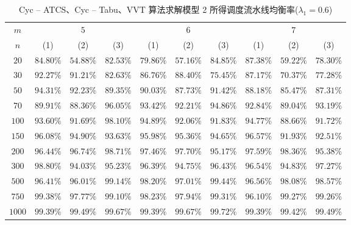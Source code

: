 \begin{table}[htbp]
  \centering
  \caption{Cyc – ATCS、Cyc – Tabu、VVT 算法求解模型 2 所得调度流水线均衡率($\lambda_1 = 0.6$)}
    \begin{tabular}{cccccccccc}
    \toprule
$m $& \multicolumn{3}{c}{$5$} & \multicolumn{3}{c}{$6$} & \multicolumn{3}{c}{$7$} \\
    \cmidrule(lr){2-4} \cmidrule(lr){5-7}\cmidrule(lr){8-10}
$n $& (1)& (2) & (3)   & (1)& (2) & (3)   & (1) & (2) & (3) \\
        \midrule
    $20    $&$ 84.80\% $&$ 54.88\% $&$ 82.53\% $&$ 79.86\% $&$ 57.16\% $&$ 84.85\% $&$ 87.38\% $&$ 59.22\% $&$ 78.30\% $\\
    $30    $&$ 92.27\% $&$ 91.21\% $&$ 82.63\% $&$ 86.76\% $&$ 88.40\% $&$ 75.45\% $&$ 87.17\% $&$ 70.37\% $&$ 77.28\% $\\
    $50    $&$ 94.31\% $&$ 92.23\% $&$ 89.35\% $&$ 90.03\% $&$ 87.73\% $&$ 91.42\% $&$ 88.18\% $&$ 85.47\% $&$ 87.31\% $\\
    $70    $&$ 89.91\% $&$ 88.36\% $&$ 96.05\% $&$ 93.42\% $&$ 92.21\% $&$ 94.86\% $&$ 92.84\% $&$ 89.04\% $&$ 93.19\% $\\
    $100   $&$ 93.60\% $&$ 91.69\% $&$ 98.10\% $&$ 94.89\% $&$ 92.06\% $&$ 91.83\% $&$ 94.77\% $&$ 88.66\% $&$ 91.72\% $\\
    $150   $&$ 96.08\% $&$ 94.90\% $&$ 93.63\% $&$ 95.98\% $&$ 95.36\% $&$ 94.65\% $&$ 96.57\% $&$ 91.93\% $&$ 92.51\% $\\
    $200   $&$ 96.44\% $&$ 96.74\% $&$ 98.71\% $&$ 97.46\% $&$ 97.70\% $&$ 95.17\% $&$ 97.59\% $&$ 98.36\% $&$ 95.38\% $\\
    $300   $&$ 98.80\% $&$ 94.03\% $&$ 95.23\% $&$ 96.39\% $&$ 94.75\% $&$ 96.43\% $&$ 96.54\% $&$ 94.83\% $&$ 97.27\% $\\
    $500   $&$ 96.41\% $&$ 96.01\% $&$ 99.14\% $&$ 98.20\% $&$ 97.01\% $&$ 99.44\% $&$ 96.56\% $&$ 98.08\% $&$ 98.57\% $\\
    $750   $&$ 99.38\% $&$ 97.77\% $&$ 99.10\% $&$ 98.23\% $&$ 97.94\% $&$ 99.31\% $&$ 96.10\% $&$ 99.27\% $&$ 99.26\% $\\
    $1000  $&$ 99.39\% $&$ 99.49\% $&$ 99.67\% $&$ 99.39\% $&$ 99.67\% $&$ 99.72\% $&$ 99.39\% $&$ 99.42\% $&$ 99.49\% $\\
    \bottomrule
    \end{tabular}
  \label{tab:rb6}
\end{table}
